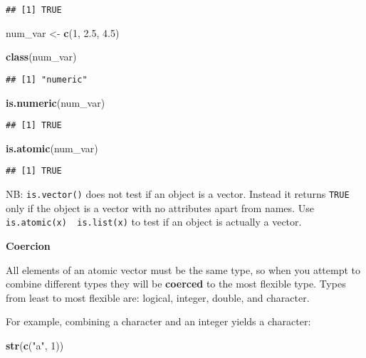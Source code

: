 \documentclass[
]{book}
\newenvironment{Shaded}{\begin{snugshade}}{\end{snugshade}}
\newcommand{\DecValTok}[1]{\textcolor[rgb]{0.00,0.00,0.81}{#1}}
\newcommand{\FloatTok}[1]{\textcolor[rgb]{0.00,0.00,0.81}{#1}}
\newcommand{\KeywordTok}[1]{\textcolor[rgb]{0.13,0.29,0.53}{\textbf{#1}}}
\newcommand{\NormalTok}[1]{#1}
\newcommand{\StringTok}[1]{\textcolor[rgb]{0.31,0.60,0.02}{#1}}
\begin{document}
\begin{verbatim}
## [1] TRUE
\end{verbatim}

\begin{Shaded}
\begin{Highlighting}[]
\NormalTok{num\_var \textless{}{-}}\StringTok{ }\KeywordTok{c}\NormalTok{(}\DecValTok{1}\NormalTok{, }\FloatTok{2.5}\NormalTok{, }\FloatTok{4.5}\NormalTok{)}

\KeywordTok{class}\NormalTok{(num\_var)}
\end{Highlighting}
\end{Shaded}

\begin{verbatim}
## [1] "numeric"
\end{verbatim}

\begin{Shaded}
\begin{Highlighting}[]
\KeywordTok{is.numeric}\NormalTok{(num\_var)}
\end{Highlighting}
\end{Shaded}

\begin{verbatim}
## [1] TRUE
\end{verbatim}

\begin{Shaded}
\begin{Highlighting}[]
\KeywordTok{is.atomic}\NormalTok{(num\_var)}
\end{Highlighting}
\end{Shaded}

\begin{verbatim}
## [1] TRUE
\end{verbatim}

NB: \texttt{is.vector()} does not test if an object is a vector. Instead it returns \texttt{TRUE} only if the object is a vector with no attributes apart from names. Use \texttt{is.atomic(x)\ \textbar{}\textbar{}\ is.list(x)} to test if an object is actually a vector.

\textbf{Coercion}

All elements of an atomic vector must be the same type, so when you attempt to combine different types they will be \textbf{coerced} to the most flexible type. Types from least to most flexible are: logical, integer, double, and character.

For example, combining a character and an integer yields a character:

\begin{Shaded}
\begin{Highlighting}[]
\KeywordTok{str}\NormalTok{(}\KeywordTok{c}\NormalTok{(}\StringTok{"a"}\NormalTok{, }\DecValTok{1}\NormalTok{))}
\end{Highlighting}
\end{Shaded}
\end{document}
